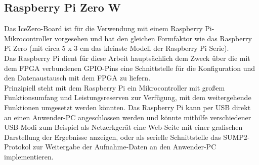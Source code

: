 \subsection{Raspberry Pi Zero W}

Das IceZero-Board ist für die Verwendung mit einem Raspberry Pi-Mikrocontroller vorgesehen und hat den gleichen Formfaktor wie das Raspberry Pi Zero (mit circa 5 x 3 cm das kleinste Modell der Raspberry Pi Serie).\\
Das Raspberry Pi dient für diese Arbeit hauptsächlich dem Zweck über die mit dem FPGA verbundenen GPIO-Pins eine Schnittstelle für die Konfiguration und den Datenaustausch mit dem FPGA zu liefern.\\
Prinzipiell steht mit dem Raspberry Pi ein Mikrocontroller mit großem Funktionsumfang und Leistungsreserven zur Verfügung, mit dem weitergehende Funktionen umgesetzt werden könnten. 
Das Raspberry Pi kann per USB direkt an einen Anwender-PC angeschlossen werden und könnte mithilfe verschiedener USB-Modi zum Beispiel als Netzerkgerät eine Web-Seite mit einer grafischen Darstellung der Ergebnisse anzeigen, oder als serielle Schnittstelle das SUMP2-Protokol zur Weitergabe der Aufnahme-Daten an den Anwender-PC implementieren. 

\clearpage




